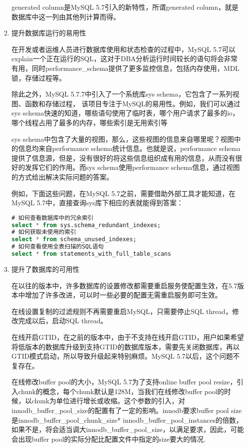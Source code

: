 \begin{enumerate}
generated column是MySQL 5.7引入的新特性，所谓generated column，就是数据库中这一列由其他列计算而得。
\item 提升数据库运行的易用性

在开发或者运维人员进行数据库使用和状态检查的过程中，MySQL 5.7可以explain一个正在运行的SQL，这对于DBA分析运行时间较长的语句将会非常有用，同时performance\_schema提供了更多监控信息，包括内存使用，MDL锁，存储过程等。

除此之外，MySQL 5.7.7中引入了一个系统库sys schema，它包含了一系列视图、函数和存储过程， 该项目专注于MySQL的易用性。例如，我们可以通过sys schema快速的知道，哪些语句使用了临时表，哪个用户请求了最多的io，哪个线程占用了最多的内存，哪些索引是无用索引等

sys schema中包含了大量的视图，那么，这些视图的信息来自哪里呢？视图中的信息均来自performance schema统计信息。也就是说，performance schema提供了信息源，但是，没有很好的将这些信息组织成有用的信息，从而没有很好的发挥它们的作用。而sys schema使用performance schema信息，通过视图的方式给出解决实际问题的答案。

例如，下面这些问题，在MySQL 5.7之前，需要借助外部工具才能知道，在MySQL 5.7中，直接查询sys库下相应的表就能得到答案：
\begin{lstlisting}[language=sql,numbers=none]
# 如何查看数据库中的冗余索引
select * from sys.schema_redundant_indexes;
# 如何获取未使用的索引
select * from schema_unused_indexes;
# 如何查看使用全表扫描的SQL语句
select * from statements_with_full_table_scans
\end{lstlisting}
\item 提升了数据库的可用性

在以往的版本中，许多数据库的设置修改都需要重启服务使配置生效，在5.7版本中增加了许多改进，可以时一些必要的配置无需重启服务即可生效。

在线设置复制的过滤规则不再需要重启MySQL，只需要停止SQL thread，修改完成以后，启动SQL thread。

在线开启GTID，在之前的版本中，由于不支持在线开启GTID，用户如果希望将低版本的数据库升级到支持GTID的数据库版本，需要先关闭数据库，再以GTID模式启动，所以导致升级起来特别麻烦。MySQL 5.7以后，这个问题不复存在。

在线修改buffer pool的大小，MySQL 5.7为了支持online buffer pool resize，引入chunk的概念，每个chunk默认是128M，当我们在线修改buffer pool的时候，以chunk为单位进行增长或收缩。这个参数的引入，对innodb\_buffer\_pool\_size的配置有了一定的影响。innodb要求buffer pool size是innodb\_buffer\_pool\_chunk\_size* innodb\_buffer\_pool\_instances的倍数，如果不是，将会适当调大innodb\_buffer\_pool\_size，以满足要求，因此，可能会出现buffer pool的实际分配比配置文件中指定的size要大的情况.


\end{enumerate}
